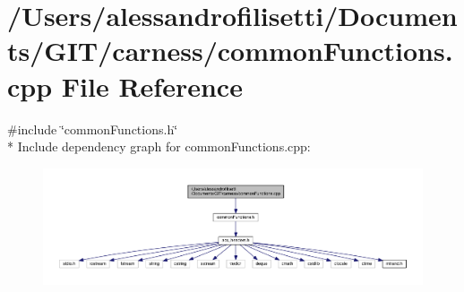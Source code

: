 \hypertarget{a00075}{\section{/\-Users/alessandrofilisetti/\-Documents/\-G\-I\-T/carness/common\-Functions.cpp File Reference}
\label{a00075}
}
{\ttfamily \#include \char`\"{}common\-Functions.\-h\char`\"{}}\\*
Include dependency graph for common\-Functions.\-cpp\-:\nopagebreak
\begin{figure}[H]
\begin{center}
\leavevmode
\includegraphics[width=350pt]{a00129}
\end{center}
\end{figure}

